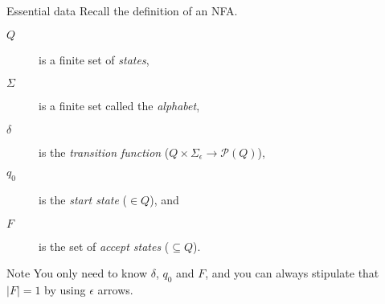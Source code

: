 \begin{frame}[fragile]{Essential data}
  Recall the definition of an NFA.
  \begin{description}
    \item[$Q$] is a finite set of \emph{states},
    \item[$\Sigma$] is a finite set called the \emph{alphabet},
    \item[$\delta$] is the \emph{transition function} ($Q \times \Sigma_{\epsilon} \rightarrow \mathcal{P}(Q)$),
    \item[$q_0$] is the \emph{start state} ($\in Q$), and
    \item[$F$] is the set of \emph{accept states} ($\subseteq Q$). 
  \end{description}

  \begin{alertblock}{Note}
  You only need to know $\delta$, $q_0$ and $F$, and you can always stipulate that $|F| = 1$ by using $\epsilon$ arrows.
  \end{alertblock}
\end{frame}





